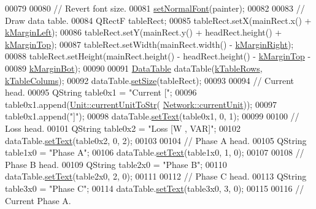 \begin{DoxyCode}
00079 
00080   \textcolor{comment}{// Revert font size.}
00081   \hyperlink{class_info_line_a4d5084d616c878cb717e8445db0023c1}{setNormalFont}(painter);
00082 
00083   \textcolor{comment}{// Draw data table.}
00084   QRectF tableRect;
00085   tableRect.setX(mainRect.x() + \hyperlink{class_info_line_a68232e6e5e3b63a4b6aced3d99291ad7}{kMarginLeft});
00086   tableRect.setY(mainRect.y() + headRect.height() + \hyperlink{class_info_line_a995100424420038664880195f5e51f50}{kMarginTop});
00087   tableRect.setWidth(mainRect.width() - \hyperlink{class_info_line_a0f0bd713ed9c1c8012bbd29dbd1db75e}{kMarginRight});
00088   tableRect.setHeight(mainRect.height() - headRect.height() - \hyperlink{class_info_line_a995100424420038664880195f5e51f50}{kMarginTop} -
00089                       \hyperlink{class_info_line_ab4bd85105aabcb9d1230225c15873da2}{kMarginBot});
00090 
00091   \hyperlink{class_data_table}{DataTable} dataTable(\hyperlink{class_info_line_a95cdc7a95cde6db7c6faceda995d26b9}{kTableRows}, \hyperlink{class_info_line_a9fc071b08eb913cf3afc623835ad2fd8}{kTableColums});
00092   dataTable.\hyperlink{class_data_table_a8a8cd6f95caaaff148993f8e28eeb703}{setSize}(tableRect);
00093 
00094   \textcolor{comment}{// Current head.}
00095   QString table0x1 = \textcolor{stringliteral}{"Current ["};
00096   table0x1.append(\hyperlink{class_unit_a7bd3ed3edcb18170cd162d384075b651}{Unit::currentUnitToStr}(
      \hyperlink{group___models_gac6a26db5fef2b1dd2a00faf6340d1702}{Network::currentUnit}));
00097   table0x1.append(\textcolor{stringliteral}{"]"});
00098   dataTable.\hyperlink{class_data_table_aee0d28c77116b51360f0124a529cb3ff}{setText}(table0x1, 0, 1);
00099 
00100   \textcolor{comment}{// Loss head.}
00101   QString table0x2 = \textcolor{stringliteral}{"Loss [W , VAR]"};
00102   dataTable.\hyperlink{class_data_table_aee0d28c77116b51360f0124a529cb3ff}{setText}(table0x2, 0, 2);
00103 
00104   \textcolor{comment}{// Phase A head.}
00105   QString table1x0 = \textcolor{stringliteral}{"Phase A"};
00106   dataTable.\hyperlink{class_data_table_aee0d28c77116b51360f0124a529cb3ff}{setText}(table1x0, 1, 0);
00107 
00108   \textcolor{comment}{// Phase B head.}
00109   QString table2x0 = \textcolor{stringliteral}{"Phase B"};
00110   dataTable.\hyperlink{class_data_table_aee0d28c77116b51360f0124a529cb3ff}{setText}(table2x0, 2, 0);
00111 
00112   \textcolor{comment}{// Phase C head.}
00113   QString table3x0 = \textcolor{stringliteral}{"Phase C"};
00114   dataTable.\hyperlink{class_data_table_aee0d28c77116b51360f0124a529cb3ff}{setText}(table3x0, 3, 0);
00115 
00116   \textcolor{comment}{// Current Phase A.}

\end{DoxyCode}
